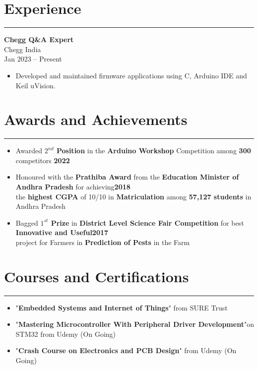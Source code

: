 \documentclass[10pt]{article}
\begin{document}
\section*{Experience}
\hrule
\begin{multicols}{2}
\textbf{Chegg Q\&A Expert} \\
Chegg India \\
Jan 2023 – Present\\
\columnbreak
\begin{itemize}[leftmargin=*]
\item Developed and maintained firmware applications using C, Arduino IDE and Keil uVision.
\end{itemize}
\end{multicols}

\section*{Awards and Achievements}
\hrule
\vspace{0.5cm}
\begin{itemize}[leftmargin=*]

\item Awarded \textbf{$2^{nd}$ Position} in the \textbf{Arduino Workshop} Competition among \textbf{300} competitors
\hspace{4cm}
\textbf{2022}

\item Honoured with the \textbf{Prathiba Award} from the \textbf{Education Minister of Andhra Pradesh} for achieving\hspace{1.8cm}\textbf{2018}\\ the \textbf{highest CGPA} of 10/10 in \textbf{Matriculation} among \textbf{57,127 students} in Andhra Pradesh

\item Bagged \textbf{$1^{st}$ Prize} in \textbf{District Level Science Fair Competition} for best \textbf{Innovative and Useful}\hspace{2.2cm}\textbf{2017}\\ project for Farmers in \textbf{Prediction of Pests} in the Farm
\end{itemize}

\section*{Courses and Certifications}
\hrule
\vspace{0.5em}
\begin{itemize}[leftmargin=*]
\item "\textbf{Embedded Systems and Internet of Things}" from SURE Trust
\item "\textbf{Mastering Microcontroller With Peripheral Driver Development}"on STM32 from Udemy (On Going)
\item "\textbf{Crash Course on Electronics and PCB Design}" from Udemy (On Going)
\end{itemize}
\end{document}
